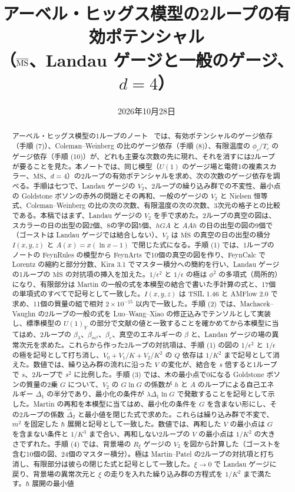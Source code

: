 \documentclass[a4paper,10pt]{ltjsarticle}
\title{アーベル・ヒッグス模型の2ループの有効ポテンシャル\\（$\MSbar$、Landau ゲージと一般のゲージ、$d=4$）}
\author{}
\date{2026年10月28日}
\newcommand{\MSbar}{\overline{\mathrm{MS}}}
\begin{document}
\maketitle

\begin{abstract}
アーベル・ヒッグス模型の1ループのノート~\cite{ahnote} では、有効ポテンシャルのゲージ依存（手順 (7)）、Coleman--Weinberg の比のゲージ依存（手順 (8)）、有限温度の $\phi_c/T_c$ のゲージ依存（手順 (10)）が、どれも主要な次数の先に現れ、それを消すには2ループが要ることを見た。本ノートでは、同じ模型（$U(1)$ のゲージ場と電荷1の複素スカラー、$\MSbar$、$d=4$）の2ループの有効ポテンシャルを求め、次の次数のゲージ依存を調べる。手順は七つで、Landau ゲージの $V_2$、2ループの繰り込み群での不変性、最小点の Goldstone ボソンの赤外の問題とその再和、一般のゲージの $V_2$ と Nielsen 恒等式、Coleman--Weinberg の比の次の次数、有限温度の次の次数、3次元の格子との比較である。本稿ではまず、Landau ゲージの $V_2$ を手で求めた。2ループの真空の図は、スカラーの日の出型の図2個、8の字の図5個、$hGA$ と $AAh$ の日の出型の図の9個で（ゴーストは Landau ゲージでは結合しない）、$V_2$ は $\MSbar$ の真空の日の出型の積分 $I(x,y,z)$ と $A(x)=x(\ln x-1)$ で閉じた式になる。手順 (1) では、1ループのノートの FeynRules の模型から FeynArts で10個の真空の図を作り、FeynCalc で Lorentz の縮約と部分分数、Kira 3.1 でマスター積分への簡約を行い、Landau ゲージの1ループの $\MSbar$ の対抗項の挿入を加えた。$1/\epsilon^2$ と $1/\epsilon$ の極は $\phi^2$ の多項式（局所的）になり、有限部分は Martin の一般の式を本模型の結合で書いた手計算の式と、17個の単項式のすべてで記号として一致した。$I(x,y,z)$ は TSIL 1.46 と AMFlow 2.0 で求め、11個の質量の組で相対 $2\times10^{-15}$ 以内で一致した。手順 (2) では、Machacek--Vaughn の2ループの一般の式を Luo--Wang--Xiao の修正込みでテンソルとして実装し、標準模型の $U(1)_Y$ の部分で文献の値と一致することを確かめてから本模型に当てはめ、2ループの $\beta_\lambda$、$\beta_{m^2}$、$\beta_e$、真空のエネルギーの $\beta$ と、Landau ゲージの場の異常次元を求めた。これらから作った2ループの対抗項は、手順 (1) の図の $1/\epsilon^2$ と $1/\epsilon$ の極を記号として打ち消し、$V_0+V_1/K+V_2/K^2$ の $Q$ 依存は $1/K^2$ まで記号として消えた。数値では、繰り込み群の流れに沿った $V$ の変化が、結合を $s$ 倍すると1ループで $s$、2ループで $s^2$ に比例した。手順 (3) では、木の最小点で0になる Goldstone ボソンの質量の2乗 $G$ について、$V_2$ の $G\ln G$ の係数が $h$ と $A$ のループによる自己エネルギー $\Delta_1$ の半分であり、最小化の条件が $\lambda\Delta_1\ln G$ で発散することを記号として示した。Martin の再和を本模型に当てはめ、最小化の条件を $G$ を含まない形にし、その2ループの係数 $\hat\Delta_2$ と最小値を閉じた式で求めた。これらは繰り込み群で不変で、$m^2$ を固定した $\hbar$ 展開と記号として一致した。数値では、再和した $V$ の最小点は $G$ を含まない条件と $1/K^3$ まで合い、再和しない2ループの $V$ の最小点は $1/K^2$ の大きさでずれた。手順 (4) では、背景場の $R_\xi$ ゲージの $V_2$ を図から計算した（ゴーストを含む10個の図、24個のマスター積分）。極は Martin--Patel の2ループの対抗項と打ち消し、有限部分は彼らの閉じた式と記号として一致した。$\xi\to0$ で Landau ゲージに戻り、背景場の異常次元と $\xi$ の走りを入れた繰り込み群の方程式を $1/K^2$ まで満たす。$\hbar$ 展開の最小値 
\end{abstract}
\end{document}
